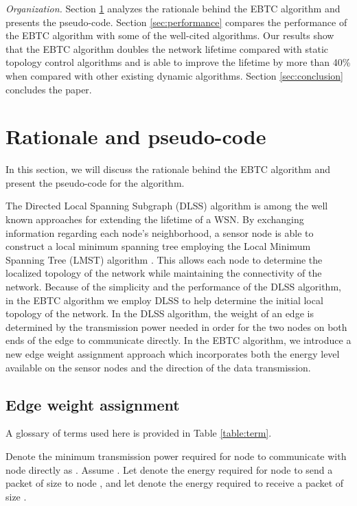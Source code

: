 \documentclass[journal,12pt,onecolumn]{IEEEtran}
\begin{document}
{\em Organization.} Section
\ref{sec:pseudo_code} analyzes the rationale behind the EBTC algorithm
and presents the pseudo-code. Section
\ref{sec:performance} compares the performance of
the EBTC algorithm with some of the well-cited algorithms. Our
results show that the EBTC algorithm doubles the network
lifetime compared with static topology control algorithms and is able to improve the lifetime
by more than 40\% when compared with other existing dynamic algorithms.
Section \ref{sec:conclusion}
concludes the paper.

\section{Rationale and pseudo-code }\label{sec:pseudo_code}
In this section, we will discuss the rationale behind the EBTC
algorithm and present the pseudo-code for the algorithm.

The Directed Local Spanning Subgraph (DLSS) \cite{LiHou2005-1313}
algorithm is among the well known approaches for extending the
lifetime of a WSN. By exchanging information regarding each
node's neighborhood, a sensor node is able to construct a local
minimum spanning tree employing the Local Minimum Spanning Tree
(LMST) algorithm \cite{LiHou2005-1313}. This allows each node to
determine the localized topology of the network while maintaining the connectivity of the network. Because of the simplicity
and the performance of the DLSS algorithm, in the EBTC algorithm we
employ DLSS to help determine the initial local topology of the
network.
In the DLSS algorithm, the weight of an
edge is determined by the transmission power needed in order for the
two nodes on both ends of the edge to communicate directly. In the
EBTC algorithm, we introduce a new edge weight assignment approach
which incorporates both the energy level available on the sensor nodes
and the direction of the data transmission.



\subsection{Edge weight assignment}

A glossary of terms used here is provided in Table \ref{table:term}.

Denote the minimum transmission power required for node  to
communicate with node  directly as . Assume
. Let  denote the energy required for
node  to send a packet of size  to node , and let
 denote the energy required to receive a packet of size .
\end{document}
